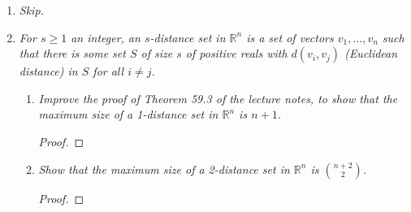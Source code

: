 \documentclass{article}
\begin{document}
\begin{enumerate}
\begin{enumerate}
\begin{proof}
          Using the above claim, we iteratively construct a set $C$ in
          $\mathcal{A}$ that is contained in $B_{k+1}$, a contradiction:
          Write $B_{k+1}=\{b_1,\ldots,b_{m+1}\}$. Let $C_0$ be an arbitrary
          set in $\mathcal{A}$. The idea of the construction is to
          gradually replace each element in $C_0$ with elements in
          $B_{k+1}$, using the above claim, until we get
          $C=C_m=\{b_1,\ldots,b_m\}$. At each stage $s\leq m$, $C_s$ will be
          contained in $\mathcal{A}$, and contain the elements
          $\{b_1,\ldots,b_s\}$. At stage $s+1$, write
          \[C_s=\{b_1,\ldots,b_s,a_{s+1},\ldots,a_m\} \in\mathcal{A}.\]
          If $b_{s+1}$ lies in $C_s$, set $C_{s+1}=C_s$ and go to the next
          stage. Otherwise $C_s\cup\{b_{s+1}\}$ lies in $\mathcal{B}$ by
          the above claim since $C_s$ lies in $\mathcal{A}$. Let
          $D_s\in\mathcal{B}$ be a set in $\mathcal{B}$ that contains
          $C_s\cup\{b_{s+1}\}$, and write
          \[D_s=\{b_1,\ldots,b_{s+1},d_{s+2},\ldots,d_{m+1}\}
          \in\mathcal{B}.\]
          Then let $C_{s+1}=\{b_1,\ldots,b_{s+1},d_{s+2},\ldots,d_{m}\}$;
          this will be contained in $\mathcal{A}$ from the above claim and
          contain $\{b_1,\ldots,b_{s+1}\}$ as required.
          
        \end{proof}
    \end{enumerate}

  \item \it Skip.

  \item \it For $s\geq1$ an integer, an $s$-distance set in $\mathbb{R}^n$
    is a set of vectors $v_1,\ldots,v_n$ such that there is some set $S$ of
    size $s$ of positive reals with $d(v_i,v_j)$ (Euclidean distance) in
    $S$ for all $i\neq j$.

    \begin{enumerate}
      \item \it Improve the proof of Theorem 59.3 of the lecture notes, to
        show that the maximum size of a 1-distance set in $\mathbb{R}^n$ is
        $n+1$.

        \begin{proof}
        \end{proof}

      \item \it Show that the maximum size of a 2-distance set in
        $\mathbb{R}^n$ is $\binom{n+2}{2}$.

        \begin{proof}
        \end{proof}
    \end{enumerate}
\end{enumerate}
\end{document}
